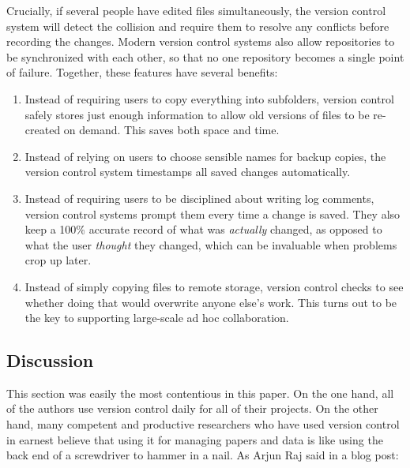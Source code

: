 \documentclass[10pt]{article}
\begin{document}
Crucially, if several people have edited files simultaneously, the
version control system will detect the collision and require them to
resolve any conflicts before recording the changes. Modern version
control systems also allow repositories to be synchronized with each
other, so that no one repository becomes a single point of failure.
Together, these features have several benefits:

\begin{enumerate}
\item
  Instead of requiring users to copy everything into subfolders, version
  control safely stores just enough information to allow old versions of
  files to be re-created on demand. This saves both space and time.
\item
  Instead of relying on users to choose sensible names for backup
  copies, the version control system timestamps all saved changes
  automatically.
\item
  Instead of requiring users to be disciplined about writing log
  comments, version control systems prompt them every time a change is
  saved. They also keep a 100\% accurate record of what was
  \emph{actually} changed, as opposed to what the user \emph{thought}
  they changed, which can be invaluable when problems crop up later.
\item
  Instead of simply copying files to remote storage, version control
  checks to see whether doing that would overwrite anyone else's work.
  This turns out to be the key to supporting large-scale ad hoc
  collaboration.
\end{enumerate}

\subsection*{Discussion}

This section was easily the most contentious in this paper.  On the
one hand, all of the authors use version control daily for all of
their projects.  On the other hand, many competent and productive
researchers who have used version control in earnest believe that
using it for managing papers and data is like using the back end of a
screwdriver to hammer in a nail.  As Arjun Raj said in a blog post:
\end{document}
